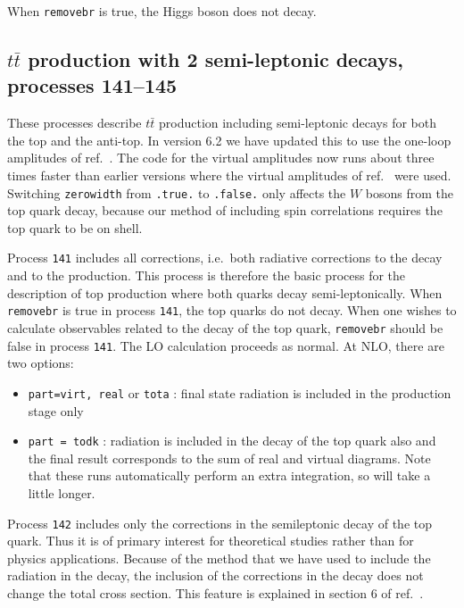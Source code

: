 When {\tt removebr} is true, the Higgs boson does not decay.

\subsection{$t\bar{t}$ production with 2 semi-leptonic decays, processes 141--145}
\label{subsec:ttbar}

These processes describe $t \bar{t}$ production including semi-leptonic
decays for both the top and the anti-top. 
In version 6.2 we have updated this to use the one-loop amplitudes of
ref.~\cite{Badger:2011yu}. The code for the virtual amplitudes now runs
about three times faster than earlier versions where the virtual
amplitudes of ref.~\cite{Korner:2002hy} were used.  
Switching {\tt zerowidth} from {\tt .true.} to {\tt .false.} only affects 
the $W$ bosons from the top quark decay, because our method of including spin
correlations requires the top quark to be on shell.

Process {\tt 141} includes all corrections, i.e.\ both radiative corrections
to the decay and to the production. This process is therefore the
basic process for the description of top production where both quarks
decay semi-leptonically.  When {\tt removebr} is true in process {\tt 141},
the top quarks do not decay.
When one wishes to calculate observables related to the decay of the top
quark, {\tt removebr} should be false in process {\tt 141}.
The LO calculation proceeds as normal. 
At NLO, there are two options:
\begin{itemize}
\item {\tt part=virt, real} or {\tt tota} : final state radiation is included
in the production stage only
\item {\tt part = todk} : radiation is included in the decay of the top
quark also and the final result corresponds to the sum of real and virtual
diagrams. 
Note that these runs automatically perform an extra integration, so
will take a little longer.
\end{itemize}

Process {\tt 142} includes only the corrections in
the semileptonic decay of the top quark. Thus it is of primary
interest for theoretical studies rather than for physics applications.  
Because of the method that we have used to include the radiation in the decay,
the inclusion of the corrections in the decay does not change the
total cross section. This feature is explained in section 6 of ref.~\cite{Campbell:2012uf}.

